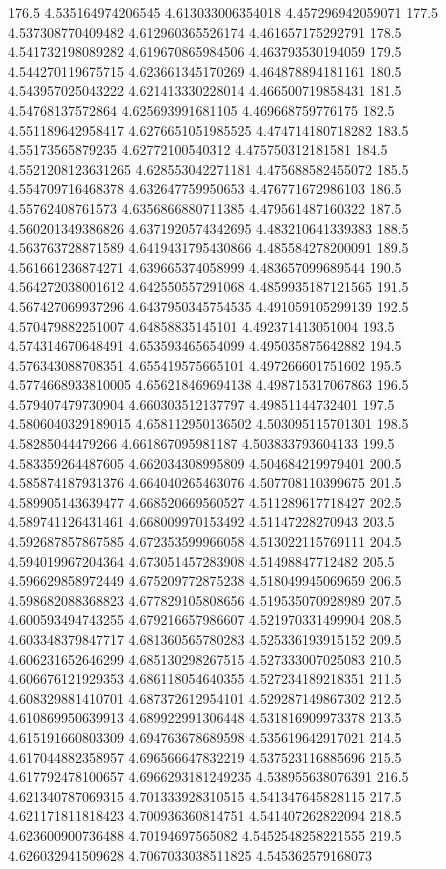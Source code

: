 176.5 4.535164974206545 4.613033006354018 4.457296942059071
177.5 4.537308770409482 4.612960365526174 4.461657175292791
178.5 4.541732198089282 4.619670865984506 4.463793530194059
179.5 4.544270119675715 4.623661345170269 4.464878894181161
180.5 4.543957025043222 4.621413330228014 4.466500719858431
181.5 4.54768137572864 4.625693991681105 4.469668759776175
182.5 4.551189642958417 4.6276651051985525 4.474714180718282
183.5 4.55173565879235 4.62772100540312 4.475750312181581
184.5 4.5521208123631265 4.628553042271181 4.475688582455072
185.5 4.554709716468378 4.632647759950653 4.476771672986103
186.5 4.55762408761573 4.6356866880711385 4.479561487160322
187.5 4.560201349386826 4.6371920574342695 4.483210641339383
188.5 4.563763728871589 4.6419431795430866 4.485584278200091
189.5 4.561661236874271 4.639665374058999 4.483657099689544
190.5 4.564272038001612 4.642550557291068 4.4859935187121565
191.5 4.567427069937296 4.6437950345754535 4.491059105299139
192.5 4.570479882251007 4.64858835145101 4.492371413051004
193.5 4.574314670648491 4.653593465654099 4.495035875642882
194.5 4.576343088708351 4.655419575665101 4.497266601751602
195.5 4.5774668933810005 4.656218469694138 4.498715317067863
196.5 4.579407479730904 4.660303512137797 4.49851144732401
197.5 4.5806040329189015 4.658112950136502 4.503095115701301
198.5 4.58285044479266 4.661867095981187 4.503833793604133
199.5 4.583359264487605 4.662034308995809 4.504684219979401
200.5 4.585874187931376 4.664040265463076 4.507708110399675
201.5 4.589905143639477 4.668520669560527 4.511289617718427
202.5 4.589741126431461 4.668009970153492 4.51147228270943
203.5 4.592687857867585 4.672353599966058 4.513022115769111
204.5 4.594019967204364 4.673051457283908 4.51498847712482
205.5 4.596629858972449 4.675209772875238 4.518049945069659
206.5 4.598682088368823 4.677829105808656 4.519535070928989
207.5 4.600593494743255 4.679216657986607 4.521970331499904
208.5 4.603348379847717 4.681360565780283 4.525336193915152
209.5 4.606231652646299 4.685130298267515 4.527333007025083
210.5 4.606676121929353 4.686118054640355 4.527234189218351
211.5 4.608329881410701 4.687372612954101 4.529287149867302
212.5 4.610869950639913 4.689922991306448 4.531816909973378
213.5 4.615191660803309 4.694763678689598 4.535619642917021
214.5 4.617044882358957 4.696566647832219 4.537523116885696
215.5 4.617792478100657 4.6966293181249235 4.538955638076391
216.5 4.621340787069315 4.701333928310515 4.541347645828115
217.5 4.621171811818423 4.700936360814751 4.541407262822094
218.5 4.623600900736488 4.70194697565082 4.5452548258221555
219.5 4.626032941509628 4.7067033038511825 4.545362579168073
